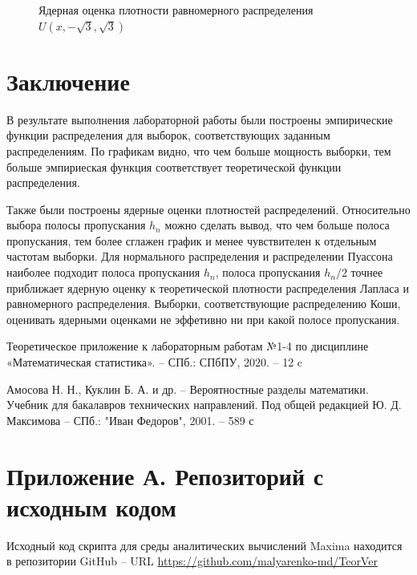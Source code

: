 \documentclass[12pt]{article}
\newcommand{\lskip}{\hfill\break}
\begin{document}
\begin{flushleft}
\begin{figure}[h!]
\begin{minipage}[h]{0.325\linewidth}
         \end{minipage}
         \caption{Ядерная оценка плотности равномерного распределения $U(x, -\sqrt{3}, \sqrt{3})$}
         \end{figure}
         \lskip

\newpage

\section*{Заключение}

        В результате выполнения лабораторной работы были построены эмпирические функции распределения для выборок, соответствующих заданным распределениям. По графикам видно, что чем больше мощность выборки, тем больше эмпириеская функция соответствует теоретической функции распределения.

        Также были построены ядерные оценки плотностей распределений. Относительно выбора полосы пропускания $h_n$ можно сделать вывод, что чем больше полоса пропускания, тем более сглажен график и менее чувствителен к отдельным частотам выборки. Для нормального распределения и распределении Пуассона наиболее подходит полоса пропускания $h_n$, полоса пропускания $h_n / 2$ точнее приближает ядерную оценку к теоретической плотности распределения Лапласа и равномерного распределения. Выборки, соответствующие распределению Коши, оценивать ядерными оценками не эффетивно ни при какой полосе пропускания.

\newpage


\begin{thebibliography}{9}

        Теоретическое приложение к лабораторным работам №1-4 по дисциплине «Математическая статистика». -- СПб.: СПбПУ, 2020. -- 12 c

         Амосова Н. Н., Куклин Б. А. и др. -- Вероятностные разделы математики. Учебник для бакалавров технических направлений. Под общей редакцией Ю. Д. Максимова -- СПб.: "Иван Федоров", 2001. -- 589 с  
	
\end{thebibliography}

\newpage

\section*{Приложение А. Репозиторий с исходным кодом}

Исходный код скрипта для среды аналитических вычислений Maxima находится в репозитории GitHub -- URL \url{https://github.com/malyarenko-md/TeorVer}

\end{flushleft}
\end{document}
